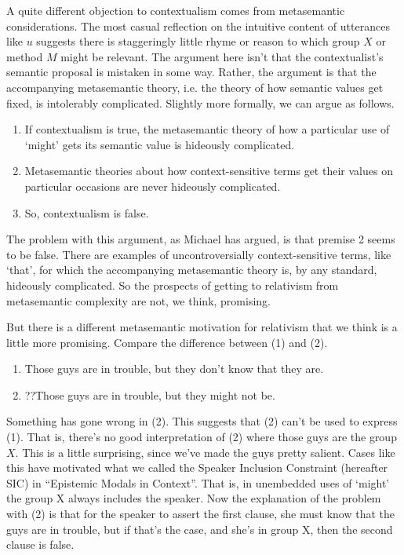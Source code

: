 A quite different objection to contextualism comes from metasemantic considerations. The most casual reflection on the intuitive content of utterances like $u$ suggests there is staggeringly little rhyme or reason to which group $X$ or method $M$ might be relevant. The argument here isn't that the contextualist's semantic proposal is mistaken in some way. Rather, the argument is that the accompanying metasemantic theory, i.e. the theory of how semantic values get fixed, is intolerably complicated. Slightly more formally, we can argue as follows.

\begin{enumerate}
\item If contextualism is true, the metasemantic theory of how a particular use of `might' gets its semantic value is hideously complicated.
\item Metasemantic theories about how context-sensitive terms get their values on particular occasions are never hideously complicated.
\item So, contextualism is false.
\end{enumerate}

\noindent The problem with this argument, as Michael \citet{Glanzberg2007} has argued, is that premise 2 seems to be false. There are examples of uncontroversially context-sensitive terms, like `that', for which the accompanying metasemantic theory is, by any standard, hideously complicated. So the prospects of getting to relativism from metasemantic complexity are not, we think, promising.

But there is a different metasemantic motivation for relativism that we think is a little more promising. Compare the difference between (1) and (2).

\begin{enumerate}
\renewcommand{\labelenumi}{(\arabic{enumi})}
\item Those guys are in trouble, but they don't know that they are.
\item ??Those guys are in trouble, but they might not be.
\end{enumerate}

\noindent Something has gone wrong in (2). This suggests that (2) can't be used to express (1). That is, there's no good interpretation of (2) where those guys are the group $X$. This is a little surprising, since we've made the guys pretty salient. Cases like this have motivated what we called the Speaker Inclusion Constraint (hereafter SIC) in ``Epistemic Modals in Context''. That is, in unembedded uses of `might' the group X always includes the speaker. Now the explanation of the problem with (2) is that for the speaker to assert the first clause, she must know that the guys are in trouble, but if that's the case, and she's in group X, then the second clause is false.

